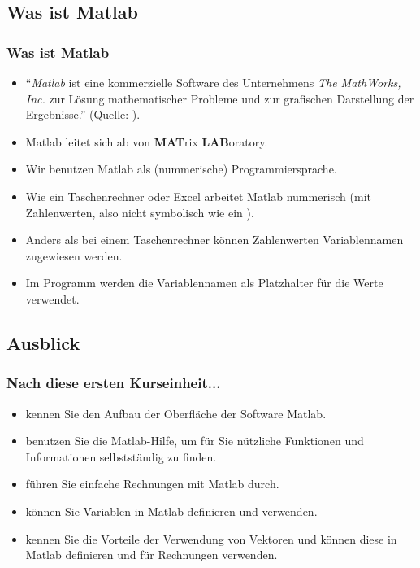     \subsection{Was ist Matlab}
    \begin{frame}
        \frametitle{Was ist Matlab}

        \begin{itemize}
          \item ``\emph{Matlab} ist eine kommerzielle Software des Unternehmens \emph{The MathWorks, Inc.} zur Lösung mathematischer Probleme
          und zur grafischen Darstellung der Ergebnisse.'' (Quelle: \href{https://de.wikipedia.org/wiki/Matlab}{}).
          \item Matlab leitet sich ab von \textbf{MAT}rix \textbf{LAB}oratory.
          \item Wir benutzen Matlab als (nummerische) Programmiersprache.
          \item Wie ein Taschenrechner oder Excel arbeitet Matlab nummerisch (mit Zahlenwerten, also nicht symbolisch wie
          ein \href{https://de.wikipedia.org/wiki/Computeralgebrasystem}{}).
          \item Anders als bei einem Taschenrechner können Zahlenwerten Variablennamen zugewiesen werden.
          \item Im Programm werden die Variablennamen als Platzhalter für die Werte verwendet.
        \end{itemize}
    \end{frame}

    \subsection{Ausblick}
    \begin{frame}
        \frametitle{Nach diese ersten Kurseinheit...}

        \begin{itemize}
          \itemsep0.3cm
          \item kennen Sie den Aufbau der Oberfläche der Software Matlab.
          \item benutzen Sie die Matlab-Hilfe, um für Sie nützliche Funktionen und Informationen selbstständig zu finden.
          \item führen Sie einfache Rechnungen mit Matlab durch.
          \item können Sie Variablen in Matlab definieren und verwenden.
          \item kennen Sie die Vorteile der Verwendung von Vektoren und können diese in Matlab definieren und für Rechnungen verwenden.
        \end{itemize}
    \end{frame}

